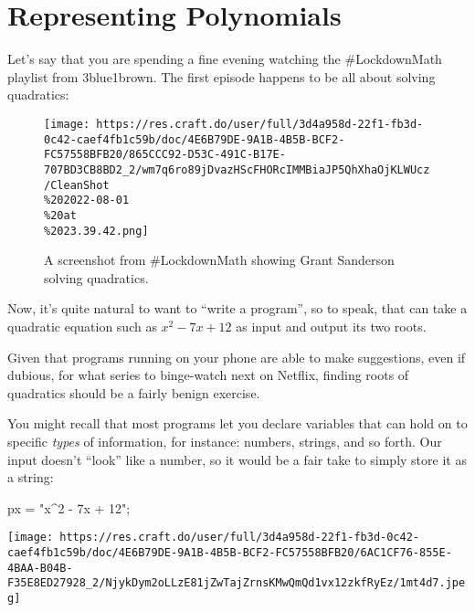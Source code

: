 \documentclass[
  letterpaper,
  DIV=11,
  numbers=noendperiod]{scrreprt}
\newenvironment{Shaded}{\begin{snugshade}}{\end{snugshade}}
\newcommand{\NormalTok}[1]{\textcolor[rgb]{0.00,0.23,0.31}{#1}}
\newcommand{\OperatorTok}[1]{\textcolor[rgb]{0.37,0.37,0.37}{#1}}
\newcommand{\StringTok}[1]{\textcolor[rgb]{0.13,0.47,0.30}{#1}}
\begin{document}
\hypertarget{representing-polynomials}{%
\section{Representing Polynomials}\label{representing-polynomials}}

Let's say that you are spending a fine evening watching the
\#LockdownMath playlist from 3blue1brown. The first episode happens to
be all about solving quadratics:

\begin{figure}

{\centering \texttt{[image: https://res.craft.do/user/full/3d4a958d-22f1-fb3d-0c42-caef4fb1c59b/doc/4E6B79DE-9A1B-4B5B-BCF2-FC57558BFB20/865CCC92-D53C-491C-B17E-707BD3CB8BD2\_2/wm7q6ro89jDvazHScFHORcIMMBiaJP5QhXhaOjKLWUcz/CleanShot\\\%202022-08-01\\\%20at\\\%2023.39.42.png]}

}

\caption{A screenshot from \#LockdownMath showing Grant Sanderson
solving quadratics.}

\end{figure}

Now, it's quite natural to want to ``write a program'', so to speak,
that can take a quadratic equation such as \(x^2 - 7x + 12\) as input
and output its two roots.

Given that programs running on your phone are able to make suggestions,
even if dubious, for what series to binge-watch next on Netflix, finding
roots of quadratics should be a fairly benign exercise.

You might recall that most programs let you declare variables that can
hold on to specific \emph{types} of information, for instance: numbers,
strings, and so forth. Our input doesn't ``look'' like a number, so it
would be a fair take to simply store it as a string:

\begin{Shaded}
\begin{Highlighting}[]
\NormalTok{px }\OperatorTok{=} \StringTok{"x\^{}2 {-} 7x + 12"}\OperatorTok{;}
\end{Highlighting}
\end{Shaded}

\begin{tcolorbox}[standard jigsaw,titlerule=0mm, leftrule=.75mm, colbacktitle=quarto-callout-note-color!10!white, toptitle=1mm, toprule=.15mm, colframe=quarto-callout-note-color-frame, colback=white, coltitle=black, title=\textcolor{quarto-callout-note-color}{\faInfo}\hspace{0.5em}{Now\ldots{}}, bottomrule=.15mm, rightrule=.15mm, bottomtitle=1mm, left=2mm, opacitybacktitle=0.6, arc=.35mm, opacityback=0]
\texttt{[image: https://res.craft.do/user/full/3d4a958d-22f1-fb3d-0c42-caef4fb1c59b/doc/4E6B79DE-9A1B-4B5B-BCF2-FC57558BFB20/6AC1CF76-855E-4BAA-B04B-F35E8ED27928\_2/NjykDym2oLLzE81jZwTajZrnsKMwQmQd1vx12zkfRyEz/1mt4d7.jpeg]}
\end{tcolorbox}
\end{document}
